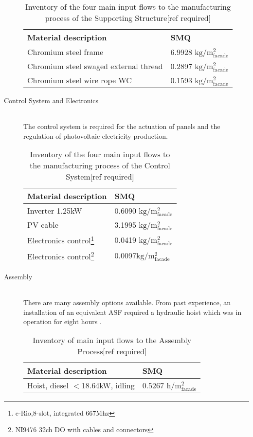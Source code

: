 \begin{description}
\begin{table}[H]
\centering
\begin{tabular}{ll}
\hline
Material description & SMQ \\ \hline
Chromium steel frame & 6.9928 ${\mathrm{kg/m^2_{facade}}}$ \\
Chromium steel swaged external thread  &0.2897 ${\mathrm{kg/m^2_{facade}}}$\\
Chromium steel wire rope WC  & 0.1593 ${\mathrm{kg/m^2_{facade}}}$\\
\hline
\end{tabular}
\caption{Inventory of the four main input flows to the manufacturing process of the Supporting Structure[ref required]}
\label{tab:StructureInv}
\end{table}

\item[Control System and Electronics] \hfill \\
The control system is required for the actuation of panels and the regulation of photovoltaic electricity production.\\

\begin{table}[H]
\centering
\begin{tabular}{ll}
\hline
Material description & SMQ \\ \hline
Inverter 1.25kW	 & 0.6090 ${\mathrm{kg/m^2_{facade}}}$ \\
PV cable  & 3.1995 ${\mathrm{kg/m^2_{facade}}}$\\
Electronics control\footnote{c-Rio,8-slot, integrated 667Mhz}& 0.0419 ${\mathrm{kg/m^2_{facade}}}$\\
Electronics control\footnote{NI9476 32ch DO with cables and connectors}& 0.0097${\mathrm{kg/m^2_{facade}}}$\\
\hline
\end{tabular}
\caption{Inventory of the four main input flows to the manufacturing process of the Control System[ref required]}
\label{tab:ControlInv}
\end{table}

\item[Assembly] \hfill \\
There are many assembly options available. From past experience, an installation of an equivalent ASF required a hydraulic hoist which was in operation for eight hours \cite{jayathissa2015abs}. \\

\begin{table}[H]
\centering
\begin{tabular}{ll}
\hline
Material description & SMQ \\ \hline
Hoist, diesel  ${<}$18.64kW, idling & 0.5267 ${\mathrm{h/m^2_{facade}}}$ \\
\hline
\end{tabular}
\caption{Inventory of main input flows to the Assembly Process[ref required]}
\label{tab:AssemblyInv}
\end{table}

\end{description}

